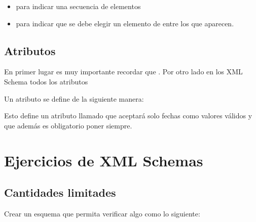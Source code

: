 \documentclass[letterpaper,10pt,spanish]{sphinxmanual}
\begin{document}
\begin{itemize}
\item {} 
 para indicar una secuencia de elementos

\item {} 
 para indicar que se debe elegir un elemento de entre los que aparecen.

\end{itemize}


\subsection{Atributos}
\label{\detokenize{tema5:id4}}
En primer lugar es muy importante recordar que . Por otro lado en los XML Schema todos los atributos 

Un atributo se define de la siguiente manera:

\begin{sphinxVerbatim}[commandchars=\\\{\}]
   
\end{sphinxVerbatim}

Esto define un atributo llamado  que aceptará solo fechas como valores válidos y que además es obligatorio poner siempre.


\section{Ejercicios de XML Schemas}
\label{\detokenize{tema5:ejercicios-de-xml-schemas}}

\subsection{Cantidades limitades}
\label{\detokenize{tema5:cantidades-limitades}}
Crear un esquema que permita verificar algo como lo siguiente:
\end{document}
